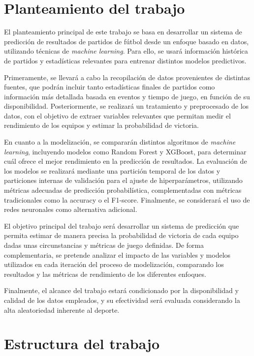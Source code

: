 \section{Planteamiento del trabajo}

El planteamiento principal de este trabajo se basa en desarrollar un sistema de predicción de resultados de partidos de fútbol desde un enfoque basado en datos, utilizando técnicas de \textit{machine learning}. Para ello, se usará información histórica de partidos y estadísticas relevantes para entrenar distintos modelos predictivos.

Primeramente, se llevará a cabo la recopilación de datos provenientes de distintas fuentes, que podrán incluir tanto estadísticas finales de partidos como información más detallada basada en eventos y tiempo de juego, en función de su disponibilidad. Posteriormente, se realizará un tratamiento y preprocesado de los datos, con el objetivo de extraer variables relevantes que permitan medir el rendimiento de los equipos y estimar la probabilidad de victoria.

En cuanto a la modelización, se compararán distintos algoritmos de \textit{machine learning}, incluyendo modelos como Random Forest y XGBoost, para determinar cuál ofrece el mejor rendimiento en la predicción de resultados. La evaluación de los modelos se realizará mediante una partición temporal de los datos y particiones internas de validación para el ajuste de hiperparámetros, utilizando métricas adecuadas de predicción probabilística, complementadas con métricas tradicionales como la accuracy o el F1-score. Finalmente, se considerará el uso de redes neuronales como alternativa adicional.

El objetivo principal del trabajo será desarrollar un sistema de predicción que permita estimar de manera precisa la probabilidad de victoria de cada equipo dadas unas circunstancias y métricas de juego definidas. De forma complementaria, se pretende analizar el impacto de las variables y modelos utilizados en cada iteración del proceso de modelización, comparando los resultados y las métricas de rendimiento de los diferentes enfoques.

Finalmente, el alcance del trabajo estará condicionado por la disponibilidad y calidad de los datos empleados, y su efectividad será evaluada considerando la alta aleatoriedad inherente al deporte.

\section{Estructura del trabajo}

